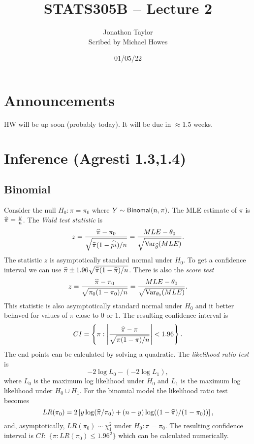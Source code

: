 




\title{STATS305B -- Lecture 2}
\author{Jonathon Taylor\\ Scribed by Michael Howes}
\date{01/05/22}

\pagestyle{fancy}
\fancyhf{}


\maketitle
\tableofcontents
\section{Announcements}
HW will be up soon (probably today). It will be due in $\approx 1.5$ weeks.
\section{Inference (Agresti 1.3,1.4)}
\subsection{Binomial}
Consider the null $H_0 : \pi = \pi_0$ where $Y \sim \mathsf{Binomal}(n,\pi)$. The MLE estimate of $\pi$ is $\widehat{\pi}= \frac{y}{n}$. The \emph{Wald test statistic} is
\[z = \frac{\widehat{\pi}-\pi_0}{\sqrt{\widehat{\pi}(1-\widehat{pi})/n}} = \frac{MLE-{\theta}_0}{\sqrt{\operatorname{Var}_{\widehat{{\theta}}}(MLE)}}.\]
The statistic $z$ is asymptotically standard normal under $H_0$. To get a confidence interval we can use $\widehat{\pi} \pm 1.96\sqrt{\widehat{\pi}(1-\widehat{\pi})/n}$. There is also the \emph{score test}
\[z = \frac{\widehat{\pi}-\pi_0}{\sqrt{\pi_0(1-\pi_0)/n}} = \frac{MLE-{\theta}_0}{\sqrt{\operatorname{Var}_{{\theta}_0}(MLE)}}. \]
This statistic is also asymptotically standard normal under $H_0$ and it better behaved for values of $\pi$ close to 0 or 1. The resulting confidence interval is
\[CI = \left\{\pi : {\left\lvert\frac{\widehat{\pi}-\pi}{\sqrt{\pi(1-\pi)/n}}\right\rvert} < 1.96\right\}.\]
The end points can be calculated by solving a quadratic. The \emph{likelihood ratio test} is
\[-2\log L_0 - (-2 \log L_1), \]
where $L_0$ is the maximum log likelihood under $H_0$ and $L_1$ is the maximum log likelihood under $H_0 \cup H_1$. For the binomial model the likelihood ratio test becomes 
\[LR(\pi_0) = 2\left[y\log(\widehat{\pi}/\pi_0)+(n-y)\log((1-\widehat{\pi})/(1-\pi_0))\right], \]
and, asymptotically, $LR(\pi_0) \sim \chi_1^2$ under $H_0 : \pi = \pi_0$. The resulting confidence interval is $CI:$  $\{\pi : LR(\pi_0) \le 1.96^2\}$ which can be calculated numerically.
